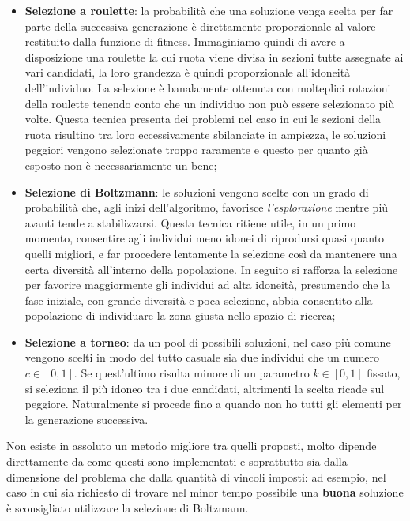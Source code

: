 \documentclass[11pt]{article}
\begin{document}
\begin{itemize}
    \item \textbf{Selezione a roulette}: la probabilità che una soluzione venga scelta per far parte della successiva generazione è direttamente proporzionale al valore restituito dalla funzione di fitness. Immaginiamo quindi di avere a disposizione una roulette la cui ruota viene divisa in sezioni tutte assegnate ai vari candidati, la loro grandezza è quindi proporzionale all'idoneità dell'individuo. La selezione è banalamente ottenuta con molteplici rotazioni della roulette tenendo conto che un individuo non può essere selezionato più volte. Questa tecnica presenta dei problemi nel caso in cui le sezioni della ruota risultino tra loro eccessivamente sbilanciate in ampiezza, le soluzioni peggiori vengono selezionate troppo raramente e questo per quanto già esposto non è necessariamente un bene;

    \item \textbf{Selezione di Boltzmann}: le soluzioni vengono scelte con un grado di probabilità che, agli inizi dell'algoritmo, favorisce \textit{l'esplorazione} mentre più avanti tende a stabilizzarsi. Questa tecnica ritiene utile, in un primo momento, consentire agli individui meno idonei di riprodursi quasi quanto quelli migliori, e far procedere lentamente la selezione così da mantenere una certa diversità all'interno della popolazione. In seguito si rafforza la selezione per favorire maggiormente gli individui ad alta idoneità, presumendo che la fase iniziale, con grande diversità e poca selezione, abbia consentito alla popolazione di individuare la zona giusta nello spazio di ricerca;

    \item \textbf{Selezione a torneo}: da un pool di possibili soluzioni, nel caso più comune vengono scelti in modo del tutto casuale sia due individui che un numero $c \in [0, 1]$. Se quest'ultimo risulta minore di un parametro $k \in [0, 1]$ fissato, si seleziona il più idoneo tra i due candidati, altrimenti la scelta ricade sul peggiore. Naturalmente si procede fino a quando non ho tutti gli elementi per la generazione successiva.
\end{itemize}

Non esiste in assoluto un metodo migliore tra quelli proposti, molto dipende direttamente da come questi sono implementati e soprattutto sia dalla dimensione del problema che dalla quantità di vincoli imposti: ad esempio, nel caso in cui sia richiesto di trovare nel minor tempo possibile una \textbf{buona} soluzione è sconsigliato utilizzare la selezione di Boltzmann.
\end{document}
